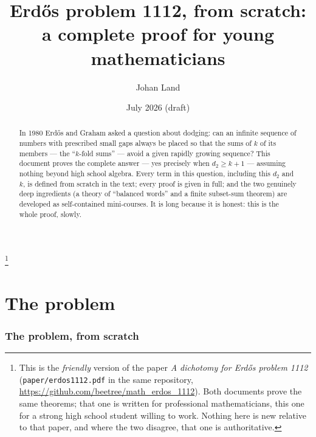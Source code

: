 \documentclass[11pt,reqno]{amsart}
\theoremstyle{plain}
\theoremstyle{definition}
\theoremstyle{remark}
\newcommand{\repo}{\url{https://github.com/beetree/math_erdos_1112}}
\begin{document}
\title[Erd\H{o}s problem 1112, from scratch]
      {Erd\H{o}s problem 1112, from scratch:\\ a complete proof for young mathematicians}

\author{Johan Land}
\address{Independent researcher}
\date{July 2026 (draft)}

\thanks{This is the \emph{friendly} version of the paper
\emph{A dichotomy for Erd\H{o}s problem 1112} (\texttt{paper/erdos1112.pdf} in the same
repository, \repo). Both documents prove the same theorems; that one is written for
professional mathematicians, this one for a strong high school student willing to work.
Nothing here is new relative to that paper, and where the two disagree, that one is
authoritative.}

\begin{abstract}
In 1980 Erd\H{o}s and Graham asked a question about dodging: can an infinite sequence of
numbers with prescribed small gaps always be placed so that the sums of $k$ of its
members --- the ``$k$-fold sums'' --- avoid a given rapidly growing sequence? This
document proves the complete answer --- yes precisely when $d_2 \ge k+1$ --- assuming
nothing beyond high school algebra. Every term in this question, including this
$d_2$ and $k$, is defined from scratch in the text; every proof is given in full; and
the two genuinely deep ingredients (a theory of ``balanced words'' and a finite
subset-sum theorem) are developed as self-contained mini-courses. It is long because it is honest: this is the
whole proof, slowly.
\end{abstract}

\maketitle

\setcounter{tocdepth}{1}
\tableofcontents

\part{The problem}

\section{The problem, from scratch}\label{sec:problem}
\end{document}
